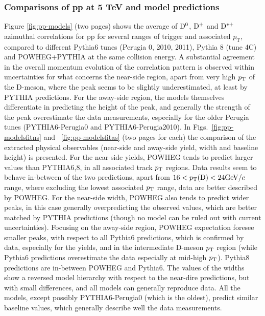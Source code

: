 \subsubsection{Comparisons of pp at 5 TeV and model predictions}
Figure \ref{fig:pp-models} (two pages) shows the average of ${\rm D^0}$, ${\rm D^+}$ and ${\rm D^{*+}}$ azimuthal correlations for pp for several ranges of trigger and associated $p_\mathrm{T}$, compared to different Pythia6 tunes (Perugia 0, 2010, 2011), Pythia 8 (tune 4C) and POWHEG+PYTHIA at the same collision energy. A substantial agreement in the overall momentum evolution of the correlation pattern is observed within uncertainties for what concerns the near-side region, apart from very high $p_{\rm T}$ of the D-meson, where the peak seems to be slightly underestimated, at least by PYTHIA predictions. For the away-side region, the models themselves differentiate in predicting the height of the peak, and generally the strength of the peak overestimate the data measurements, especially for the older Perugia tunes (PYTHIA6-Perugia0 and PYTHIA6-Perugia2010). In Figs.~\ref{fig:pp-modelsfitns} and ~\ref{fig:pp-modelsfitas} (two pages for each) the comparison of the extracted physical observables (near-side and away-side yield, width and baseline height) is presented.
For the near-side yields, POWHEG tends to predict larger values than PYTHIA6,8, in all associated track $p_{\rm T}$ regions. Data results seem to behave in-between of the two predictions, apart from $16 < p_\text{T}({\rm D}) < 24 \mathrm{GeV}/c$ range, where excluding the lowest associated $p_{\rm T}$ range, data are better described by POWHEG.
For the near-side width, POWHEG also tends to predict wider peaks, in this case generally overpredicting the observed values, which are better matched by PYTHIA predictions (though no model can be ruled out with current uncertainties).
Focusing on the away-side region, POWHEG expectation foresee smaller peaks, with respect to all Pythia6 predictions, which is confirmed by data, especially for the yields, and in the intermediate D-meson $p_{\rm T}$ region (while Pythia6 predictions overestimate the data especially at mid-high $p_{\rm T}$). Pythia8 predictions are in-between POWHEG and Pythia6. The values of the widths show a reversed model hierarchy with respect to the near-dire predictions, but with small differences, and all models can generally reproduce data.
All the models, except possibly PYTHIA6-Perugia0 (which is the oldest), predict similar baseline values, which generally describe well the data measurements.

